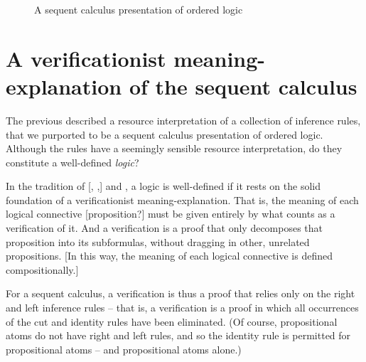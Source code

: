\begin{figure}[tbp]
  \caption{A sequent calculus presentation of ordered logic}\label{fig:ordered-logic:sequent-calculus}
\end{figure}

\section{A verificationist meaning-explanation of the sequent calculus}

The previous  described a resource interpretation of a collection of inference rules, that we purported to be a sequent calculus presentation of ordered logic.
Although the rules have a seemingly sensible resource interpretation, do they constitute a well-defined \emph{logic}?

In the tradition of \citeauthor{Gentzen:MZ35} [, \citeauthor{Dummett:HUP91},] and \citeauthor{Martin-Lof:NJPL96}, a logic is well-defined if it rests on the solid foundation of a verificationist mean\-ing-\-ex\-pla\-na\-tion.
That is, the meaning of each logical connective [proposition?] must be given entirely by what counts as a verification of it.
And a verification is a proof that only decomposes that proposition into its subformulas, without dragging in other, unrelated propositions.
[In this way, the meaning of each logical connective is defined compositionally.]

For a sequent calculus, a verification is thus a proof that relies only on the right and left inference rules -- that is, a verification is a proof in which all occurrences of the cut and identity rules have been eliminated.
(Of course, propositional atoms do not have right and left rules, and so the identity rule is permitted for propositional atoms -- and propositional atoms alone.)

